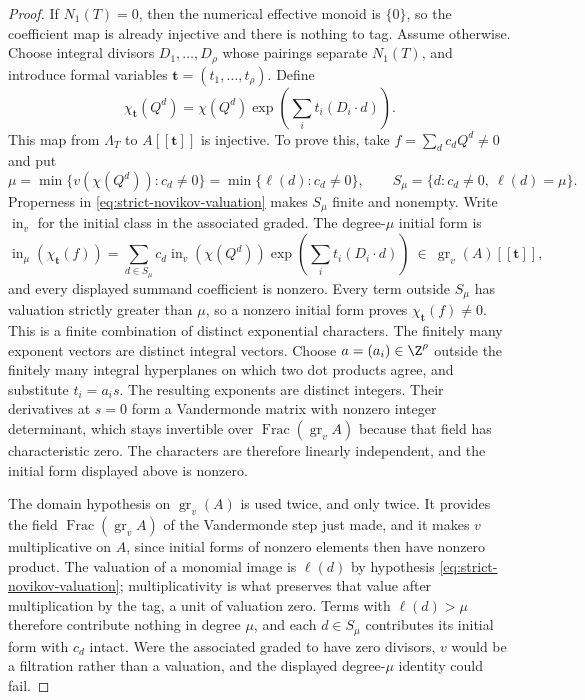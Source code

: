 \begin{proof}
If \(N_1(T)=0\), then the numerical effective monoid is \(\{0\}\), so the
coefficient map is already injective and there is nothing to tag.  Assume
otherwise.
Choose integral divisors \(D_1,\ldots,D_\rho\) whose pairings separate
\(N_1(T)\), and introduce formal variables
\(\boldsymbol t=(t_1,\ldots,t_\rho)\).  Define
\[
 \chi_{\boldsymbol t}(Q^d)=\chi(Q^d)
 \exp\!\left(\sum_i t_i(D_i\cdot d)\right).
 \tag{4.6}
 \label{eq:divisor-tagging-map}
\]
This map from \(\Lambda_T\) to \(A[[\boldsymbol t]]\) is injective.  To prove
this, take \(f=\sum_d c_dQ^d\ne0\) and put
\[
 \mu=\min\{v(\chi(Q^d)):c_d\ne0\}
     =\min\{\ell(d):c_d\ne0\},
 \qquad
 S_\mu=\{d:c_d\ne0,\ \ell(d)=\mu\}.
 \label{eq:divisor-tagging-initial-support}
\]
Properness in \eqref{eq:strict-novikov-valuation} makes \(S_\mu\) finite
and nonempty.  Write \(\operatorname{in}_v\) for the initial class in the
associated graded.  The degree-\(\mu\) initial form is
\[
 \operatorname{in}_\mu\!\left(\chi_{\boldsymbol t}(f)\right)
 =\sum_{d\in S_\mu}c_d\operatorname{in}_v\!\left(\chi(Q^d)\right)
 \exp\!\left(\sum_i t_i(D_i\cdot d)\right)
 \ \in\ \operatorname{gr}_v(A)[[\boldsymbol t]],
 \label{eq:divisor-tagging-initial-form}
\]
and every displayed summand coefficient is nonzero.  Every term outside \(S_\mu\) has valuation
strictly greater than \(\mu\), so a nonzero initial form proves
\(\chi_{\boldsymbol t}(f)\ne0\).  This is a finite combination of distinct
exponential characters.  The finitely many exponent vectors are distinct
integral vectors.  Choose \(a=(a_i)\in\Z^\rho\) outside the finitely many
integral hyperplanes on which two dot products agree, and substitute
\(t_i=a_i s\).  The resulting exponents are distinct integers.  Their
derivatives at \(s=0\) form a Vandermonde matrix with nonzero integer
determinant, which stays invertible over
\(\operatorname{Frac}(\operatorname{gr}_v A)\) because that field has
characteristic zero.  The characters are therefore linearly independent, and
the initial form displayed above is nonzero.

The domain hypothesis on \(\operatorname{gr}_v(A)\) is used twice, and only
twice.  It provides the field \(\operatorname{Frac}(\operatorname{gr}_v A)\)
of the Vandermonde step just made, and it makes \(v\) multiplicative on
\(A\), since initial forms of nonzero elements then have nonzero product.  The
valuation of a monomial image is \(\ell(d)\) by hypothesis
\eqref{eq:strict-novikov-valuation}; multiplicativity is what preserves that
value after multiplication by the tag, a unit of valuation zero.  Terms with
\(\ell(d)>\mu\) therefore contribute nothing in degree \(\mu\), and each
\(d\in S_\mu\) contributes its initial form with \(c_d\) intact.  Were the
associated graded to have zero divisors, \(v\) would be a filtration rather
than a valuation, and the displayed degree-\(\mu\) identity could fail.


\end{proof}
